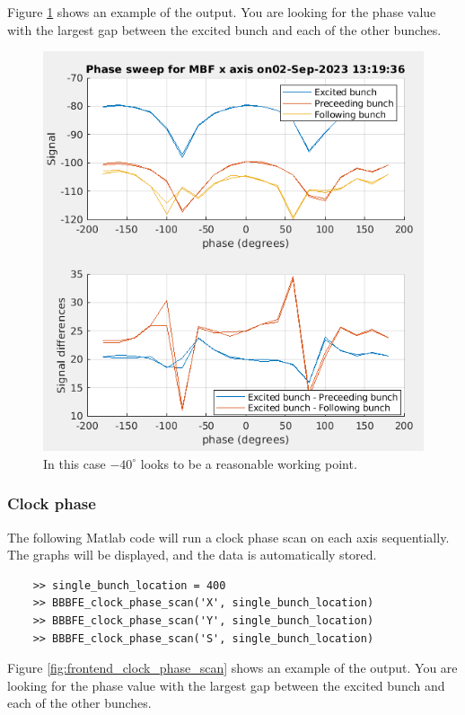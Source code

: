 \documentclass{report}
\begin{document}
Figure \ref{fig:frontend_system_phase_scan} shows an example of the output. You are looking for the phase value with the largest gap between the excited bunch and each of the other bunches. 

\begin{figure}[h]
    \centering
    \includegraphics[width=0.8\linewidth]{system_phase_sweep.png}
    \caption{In this case $-40^\circ$ looks to be a reasonable working point.}
    \label{fig:frontend_system_phase_scan}
\end{figure}
\clearpage
\subsubsection{Clock phase} 

The following Matlab code will run a clock phase scan on each axis sequentially. The graphs will be displayed, and the data is automatically stored. 

\begin{verbatim}
    >> single_bunch_location = 400
    >> BBBFE_clock_phase_scan('X', single_bunch_location)
    >> BBBFE_clock_phase_scan('Y', single_bunch_location)
    >> BBBFE_clock_phase_scan('S', single_bunch_location)
\end{verbatim}
Figure \ref{fig:frontend_clock_phase_scan} shows an example of the output. You are looking for the phase value with the largest gap between the excited bunch and each of the other bunches. 
\end{document}
